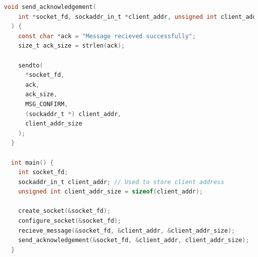 \begin{lstlisting}[language=C]
  void send_acknowledgement(
    int *socket_fd, sockaddr_in_t *client_addr, unsigned int client_addr_size
  ) {
    const char *ack = "Message recieved successfully";
    size_t ack_size = strlen(ack);
  
    sendto(
      *socket_fd,
      ack,
      ack_size,
      MSG_CONFIRM,
      (sockaddr_t *) client_addr,
      client_addr_size
    );
  }
  
  int main() {
    int socket_fd;
    sockaddr_in_t client_addr; // Used to store client address
    unsigned int client_addr_size = sizeof(client_addr);
  
    create_socket(&socket_fd);
    configure_socket(&socket_fd);
    recieve_message(&socket_fd, &client_addr, &client_addr_size);
    send_acknowledgement(&socket_fd, &client_addr, client_addr_size);
  }
\end{lstlisting}

